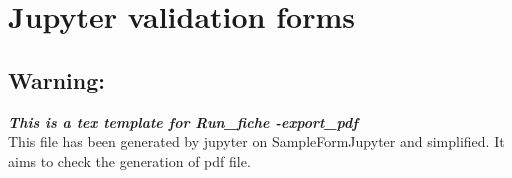 \documentclass[11pt]{article}
\begin{document}
\section{Jupyter validation forms}
\subsection{Warning:}
\textit{\textbf{This is a tex template for Run\_fiche -export\_pdf}} \\
This file has been generated by jupyter on SampleFormJupyter and simplified. It aims to check the generation of pdf file.
\end{document}
